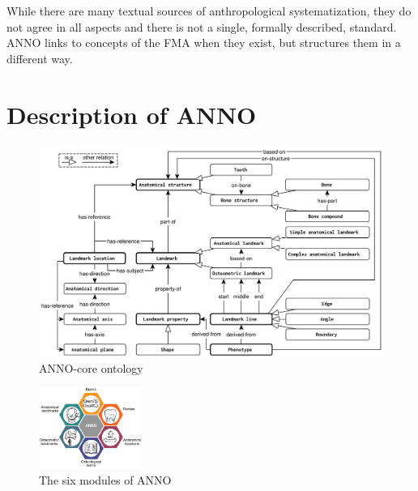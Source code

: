 \documentclass[sw]{iosart2x}
\begin{document}
While there are many textual sources of anthropological systematization, they do not agree in all aspects and there is not a single, formally described, standard.
ANNO links to concepts of the FMA when they exist, but structures them in a different way.

\section{Description of ANNO}
\begin{figure}[h]
\includegraphics[width=\textwidth]{img/core.pdf}
\caption{ANNO-core ontology}\label{fig:core}
\end{figure}

\begin{figure}[h]
\includegraphics[width=0.3\textwidth]{img/modules.pdf}
\caption{The six modules of ANNO}\label{fig:modules}
\end{figure}
\end{document}
